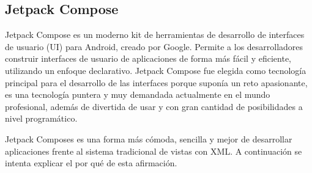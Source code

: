 \hypertarget{subsec:compose}{}
\subsection{Jetpack Compose}
Jetpack Compose\hyperlink{cap:biblio}{} es un moderno kit de herramientas de desarrollo de interfaces de usuario (UI) para Android, creado por Google. Permite a los desarrolladores construir interfaces de usuario de aplicaciones de forma más fácil y eficiente, utilizando un enfoque declarativo. Jetpack Compose fue elegida como tecnología principal para el desarrollo de las interfaces porque suponía un reto apasionante, es una tecnología puntera y muy demandada actualmente en el mundo profesional, además de divertida de usar y con gran cantidad de posibilidades a nivel programático. 

Jetpack Composes es una forma más cómoda, sencilla y mejor de desarrollar aplicaciones frente al sistema tradicional de vistas con XML. A continuación se intenta explicar el por qué de esta afirmación.
